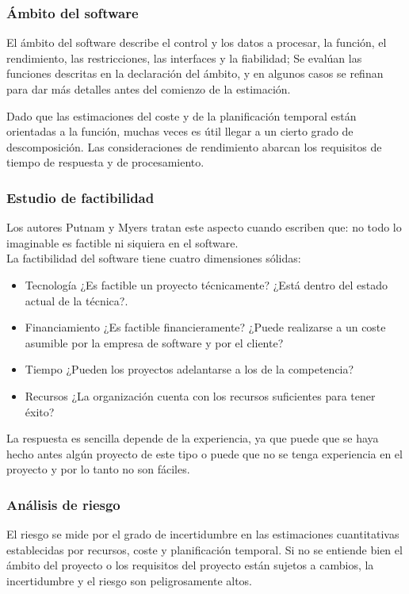 \documentclass[12pt,twoside]{article}
\begin{document}
\subsubsection{Ámbito del software}
El ámbito del software describe el control y los datos a procesar, la función, el rendimiento, 
las restricciones, las interfaces y la fiabilidad; Se evalúan las funciones 
descritas en la declaración del ámbito, y en algunos casos se refinan para dar más 
detalles antes del comienzo de la estimación.

Dado que las estimaciones del coste y de la planificación temporal están orientadas a 
la función, muchas veces es útil llegar a un cierto grado de descomposición. Las 
consideraciones de rendimiento abarcan los requisitos de tiempo de respuesta y de procesamiento.\\
\subsubsection{Estudio de factibilidad}
Los autores Putnam y Myers tratan este aspecto cuando escriben que: no todo lo imaginable es factible ni siquiera en
el software.\\
La factibilidad del software tiene cuatro dimensiones sólidas:
\begin{itemize}
    \item Tecnología ¿Es factible un proyecto técnicamente? ¿Está dentro del estado 
    actual de la técnica?. 
    \item Financiamiento ¿Es factible financieramente? ¿Puede realizarse a un coste 
    asumible por la empresa de software y por el cliente?
    \item Tiempo ¿Pueden los proyectos adelantarse a los de la competencia?
    \item Recursos ¿La organización cuenta con los recursos suficientes para tener 
    éxito?
\end{itemize}
La respuesta es sencilla depende de la experiencia, ya que puede que se haya hecho 
antes algún proyecto de este tipo o puede que no se tenga experiencia en el proyecto y 
por lo tanto no son fáciles.\\
\subsubsection{Análisis de riesgo}
El riesgo se mide por el grado de incertidumbre en las estimaciones cuantitativas establecidas 
por recursos, coste y planificación temporal. Si no se entiende bien el 
ámbito del proyecto o los requisitos del proyecto están sujetos a cambios, la 
incertidumbre y el riesgo son peligrosamente altos.
\end{document}
